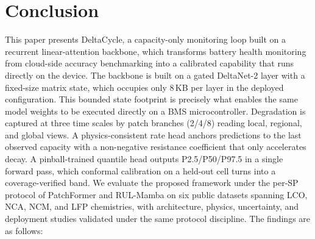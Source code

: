 \section{Conclusion}
\label{sec:conclusion}

This paper presents DeltaCycle, a capacity-only monitoring loop built on a recurrent linear-attention backbone, 
which transforms battery health monitoring from cloud-side accuracy benchmarking into a calibrated capability
that runs directly on the device. The backbone is built on a gated DeltaNet-2 layer with a fixed-size matrix state, 
which occupies only $8$\,KB per layer in the deployed configuration.
This bounded state footprint is precisely what enables the same model weights to be executed directly on a 
BMS microcontroller. Degradation is captured at three time scales by patch branches (2/4/8) reading local, regional, 
and global views. A physics-consistent rate head anchors predictions to the last observed capacity  with a 
non-negative resistance coefficient that only accelerates decay.  A pinball-trained quantile head outputs 
P2.5/P50/P97.5 in a single forward pass, which conformal calibration on a held-out cell turns into a coverage-verified band.
We evaluate the proposed framework under the per-SP protocol of PatchFormer and RUL-Mamba on six public datasets 
spanning LCO, NCA, NCM, and LFP chemistries, with architecture, physics, uncertainty, 
and deployment studies validated under the same protocol discipline. The findings
are as follows:

